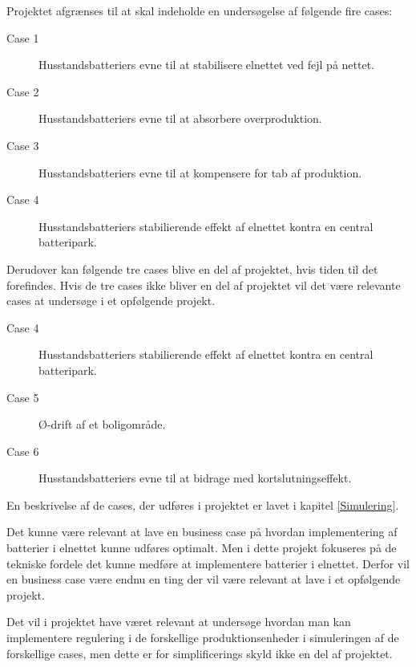 
\label{Afgraensning}

Projektet afgrænses til at skal indeholde en undersøgelse af følgende fire cases:

\begin{description}
	\item[Case 1] Husstandsbatteriers evne til at stabilisere elnettet ved fejl på nettet.
	\item[Case 2] Husstandsbatteriers evne til at absorbere overproduktion.
	\item[Case 3] Husstandsbatteriers evne til at kompensere for tab af produktion.
	\item[Case 4] Husstandsbatteriers stabilierende effekt af elnettet kontra en central batteripark.
\end{description}	
	
Derudover kan følgende tre cases blive en del af projektet, hvis tiden til det forefindes. Hvis de tre cases ikke bliver en del af projektet vil det være relevante cases at undersøge i et opfølgende projekt.

\begin{description}
	\item[Case 4] Husstandsbatteriers stabilierende effekt af elnettet kontra en central batteripark.
	\item[Case 5] Ø-drift af et boligområde.
	\item[Case 6] Husstandsbatteriers evne til at bidrage med kortslutningseffekt.
\end{description}

En beskrivelse af de cases, der udføres i projektet er lavet i kapitel \ref{Simulering}.

Det kunne være relevant at lave en business case på hvordan implementering af batterier i elnettet kunne udføres optimalt. Men i dette projekt fokuseres på de tekniske fordele det kunne medføre at implementere batterier i elnettet. Derfor vil en business case være endnu en ting der vil være relevant at lave i et opfølgende projekt.

Det vil i projektet have været relevant at undersøge hvordan man kan implementere regulering i de forskellige produktionsenheder i simuleringen af de forskellige cases, men dette er for simplificerings skyld ikke en del af projektet.